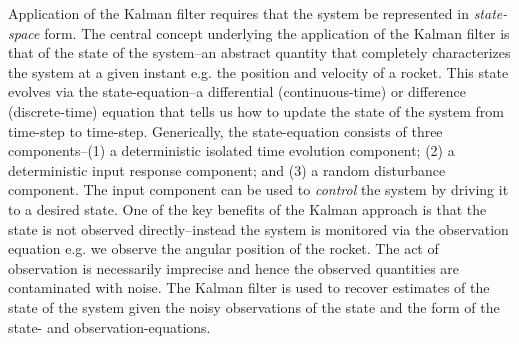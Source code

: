 \documentclass[a4paper,fleqn,usenatbib]{mnras}
\begin{document}
Application of the Kalman filter requires that the system be represented in \textit{state-space} form. The central concept underlying the application of the Kalman filter is that of the state of the system--an abstract quantity that completely characterizes the system at a given instant e.g. the position and velocity of a rocket. This state evolves via the state-equation--a differential (continuous-time) or difference (discrete-time) equation that tells us how to update the state of the system from time-step to time-step. Generically, the state-equation consists of three components--(1) a deterministic isolated time evolution component; (2) a deterministic input response component; and (3) a random disturbance component. The input component can be used to \textit{control} the system by driving it to a desired state. One of the key benefits of the Kalman approach is that the state is not observed directly--instead the system is monitored via the observation equation e.g. we observe the angular position of the rocket. The act of observation is necessarily imprecise and hence the observed quantities are contaminated with noise. The Kalman filter is used to recover estimates of the state of the system given the noisy observations of the state and the form of the state- and observation-equations. 

\end{document}
